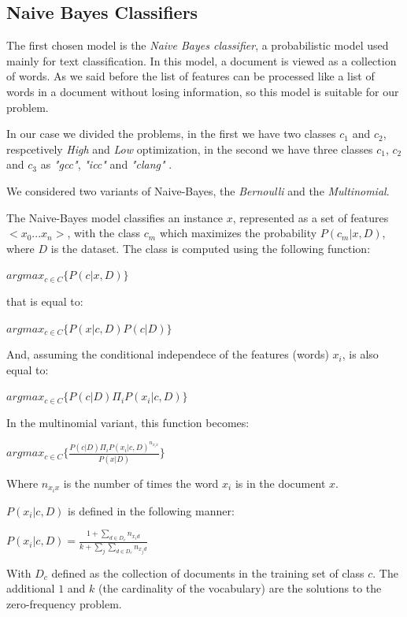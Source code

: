 \documentclass[12pt]{article}
\begin{document}
\subsection{Naive Bayes Classifiers}
The first chosen model is the {\em Naive Bayes classifier}, a probabilistic model used mainly for text classification. In this model, a document is viewed as a collection of words. As we said before the list of features can be processed like a list of words in a document without losing information, so this model is suitable for our problem.

In our case we divided the problems, in the first we have two classes $c_1$ and $c_2$, respcetively {\em High} and {\em Low} optimization, in the second we have three classes $c_1$, $c_2$ and $c_3$ as {\em "gcc"}, {\em "icc"} and {\em "clang"} .

We considered two variants of Naive-Bayes, the {\em Bernoulli} and the {\em Multinomial}.

The Naive-Bayes model classifies an instance $x$, represented as a set of features $<x_0 ... x_n>$, with the class $c_m$ which maximizes the probability $P (c_m | x, D)$, where $D$ is the dataset.
The class is computed using the following function:

\bigskip
$argmax_{c \in C}\{P (c | x, D)\}$
\bigskip

that is equal to:

\bigskip
$argmax_{c \in C}\{P (x | c, D)P (c | D)\}$
\bigskip

And, assuming the conditional independece of the features (words) $x_i$, is also equal to:

\bigskip
$argmax_{c \in C}\{P (c | D) \Pi_i P (x_i | c,D)\}$
\bigskip

In the multinomial variant, this function becomes:

\bigskip
$argmax_{c \in C}\{ \displaystyle \frac{P(c | D) \Pi_i P(x_i | c, D)^{n_{x_i x}}}{P(x | D)}\}$
\bigskip

Where $n_{x_i x}$ is the number of times the word $x_i$ is in the document $x$.

$P(x_i|c, D)$ is defined in the following manner:

\bigskip
$P(x_i|c, D) = \displaystyle \frac{1 + \sum_{d \in D_c} n_{x_i d}}{k + \sum_{j} \sum_{d \in D_c} n_{x_j d}}$
\bigskip

With $D_c$ defined as the collection of documents in the training set of class $c$.
The additional $1$ and $k$ (the cardinality of the vocabulary) are the solutions to the zero-frequency problem.
\end{document}
